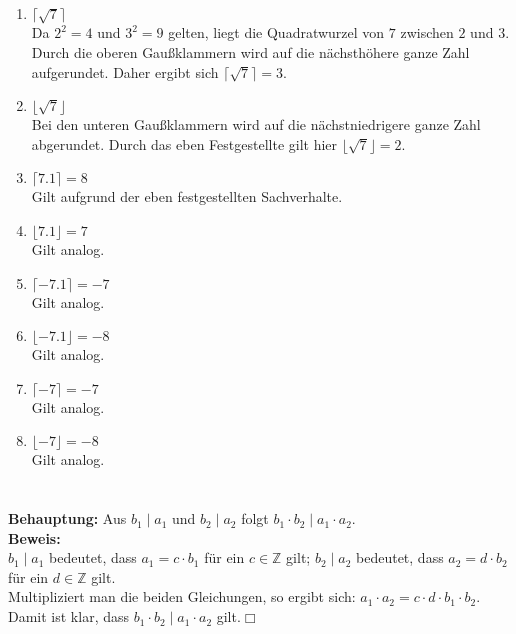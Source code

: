 \documentclass[10pt,a4paper,oneside,ngerman,numbers=noenddot]{scrartcl}
\begin{document}
\subsection{}
\begin{enumerate}
\item $\lceil \sqrt{7} \rceil$ \\
Da $2^{2}=4$ und $3^{2}=9$ gelten, liegt die Quadratwurzel von $7$ zwischen $2$ und $3$. Durch die oberen Gaußklammern wird auf die nächsthöhere ganze Zahl aufgerundet. Daher ergibt sich $\lceil \sqrt{7} \rceil=3$.
\item $\lfloor \sqrt{7} \rfloor$ \\
Bei den unteren Gaußklammern wird auf die nächstniedrigere ganze Zahl abgerundet. Durch das eben Festgestellte gilt hier $\lfloor \sqrt{7} \rfloor = 2$.
\item $\lceil 7.1 \rceil = 8$ \\
Gilt aufgrund der eben festgestellten Sachverhalte.
\item $\lfloor 7.1 \rfloor = 7$ \\
Gilt analog.
\item $\lceil -7.1 \rceil = -7$ \\
Gilt analog.
\item $\lfloor -7.1 \rfloor = -8$ \\
Gilt analog.
\item $\lceil -7 \rceil = -7$ \\
Gilt analog.
\item $\lfloor -7 \rfloor = -8$ \\
Gilt analog.
\end{enumerate}

\section{}
\addtocounter{subsubsection}{1}
\subsubsection{}
\textbf{Behauptung:} Aus $b_{1} \mid a_{1}$ und $b_{2} \mid a_{2}$ folgt $b_{1} \cdot b_{2} \mid a_{1} \cdot a_{2}$. \\
\textbf{Beweis:}\\
$b_{1} \mid a_{1}$ bedeutet, dass $a_{1}=c \cdot b_{1}$ für ein $c \in \mathbb{Z}$ gilt; $b_{2} \mid a_{2}$ bedeutet, dass $a_{2}=d \cdot b_{2}$ für ein $d \in \mathbb{Z}$ gilt. \\
Multipliziert man die beiden Gleichungen, so ergibt sich: $a_{1} \cdot a_{2} = c \cdot d \cdot b_{1} \cdot b_{2}$. Damit ist klar, dass $b_{1} \cdot b_{2} \mid a_{1} \cdot a_{2}$ gilt.\hfill $\Box$
\end{document}

